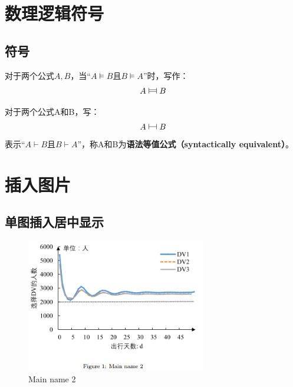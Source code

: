 \documentclass[
	draftmark = false,   %
	fontsetup = font-setup-open.tex,
	titlesetup = titles-setup.tex
]{AJbook}
\numberwithin{equation}{section}
\begin{document}
	\frontmatter	%
	
	\mainmatter		%

	\chapter{数理逻辑符号}
	\newcommand\tauteq{\mathrel{\vDash \mkern -2.25mu
                               \mathrel{\reflectbox{\ensuremath\vDash}}}}

	\newcommand\syeq{\mathrel{\vdash \mkern -2.25mu
                               \mathrel{\reflectbox{\ensuremath\vdash}}}}
	
	\section{符号}
	对于两个公式$A,B$，当“$A \vDash B$且$B \vDash A$”时，写作：
	$$
		A \tauteq B
	$$

	对于两个公式A和B，写：
	$$
		A \syeq B
	$$
	表示“$A \vdash B$且$B \vdash A$”，称A和B为\textbf{语法等值公式（syntactically equivalent）}。

	\chapter{插入图片}
	\section{单图插入居中显示}
	\begin{figure}[H] %
	\centering %
	\includegraphics[width=0.7\textwidth]{./imgs/figure-1.png} %
	\caption{Main name 2} %
	\label{Fig.main1} %
	\end{figure}
\end{document}
